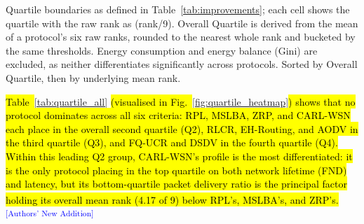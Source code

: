 \documentclass[12pt]{article}
\newcommand{\rtag}[1]{\textsuperscript{\textcolor{blue}{\scriptsize\,[#1]}}}
\newcommand{\hlx}[1]{{\exhyphenpenalty=10000\hyphenpenalty=10000\let\ \nobreakspace\hl{#1}}}
\begin{document}
\begin{table}[!t]
\renewcommand{\arraystretch}{1.2}
\caption{Quartile Standing of All Nine Protocols Across Six Statistically Differentiated Criteria --- Mixed Traffic}
\label{tab:quartile_all}
\centering
{}
\vspace{2pt}
{\footnotesize \raggedright Quartile boundaries as defined in Table~\ref{tab:improvements}; each cell shows the quartile with the raw rank as (rank/9). Overall Quartile is derived from the mean of a protocol's six raw ranks, rounded to the nearest whole rank and bucketed by the same thresholds. Energy consumption and energy balance (Gini) are excluded, as neither differentiates significantly across protocols. Sorted by Overall Quartile, then by underlying mean rank.\par}
\end{table}

\hlx{Table~}\ref{tab:quartile_all}\hlx{ (visualised in
Fig.~}\ref{fig:quartile_heatmap}\hlx{) shows that no protocol dominates
across all six criteria: RPL, MSLBA, ZRP, and CARL-WSN each place in
the overall second quartile (Q2), RLCR, EH-Routing, and AODV in the
third quartile (Q3), and FQ-UCR and DSDV in the fourth quartile (Q4).
Within this leading Q2 group, CARL-WSN's profile is the most
differentiated: it is the only protocol placing in the top quartile
on both network lifetime (FND) and latency, but its bottom-quartile
packet delivery ratio is the principal factor holding its overall
mean rank (4.17 of 9) below RPL's, MSLBA's, and ZRP's.}\rtag{Authors' New Addition}
\end{document}
